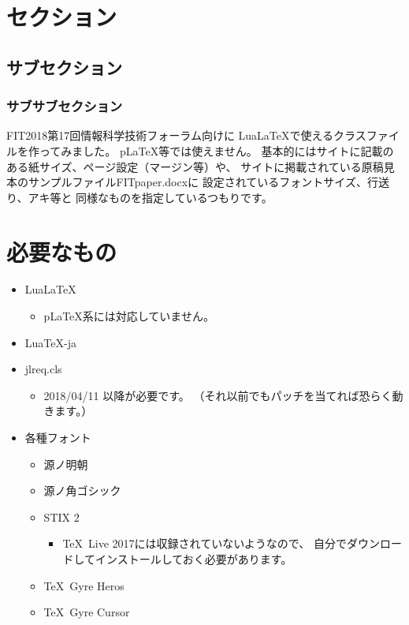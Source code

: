 \documentclass{FITpaper}
\begin{document}
\maketitle

\section{セクション}
\subsection{サブセクション}
\subsubsection{サブサブセクション}

FIT2018第17回情報科学技術フォーラム\cite{fit2018}向けに
Lua\LaTeX で使えるクラスファイル\cite{fitpaper-class}を作ってみました。
p\LaTeX 等では使えません。
基本的にはサイトに記載のある紙サイズ、ページ設定（マージン等）や、
サイトに掲載されている原稿見本のサンプルファイルFITpaper.docxに
設定されているフォントサイズ、行送り、アキ等と
同様なものを指定しているつもりです。

\section{必要なもの}

\begin{itemize}
\item Lua\LaTeX
  \begin{itemize}
  \item p\LaTeX 系には対応していません。
  \end{itemize}
\item Lua\TeX -ja
\item jlreq.cls
  \begin{itemize}
  \item 2018/04/11 以降が必要です。
    （それ以前でもパッチ\cite{column_gap}を当てれば恐らく動きます。）
  \end{itemize}
\item 各種フォント
  \begin{itemize}
  \item 源ノ明朝
  \item 源ノ角ゴシック
  \item STIX 2
    \begin{itemize}
    \item \TeX~Live 2017には収録されていないようなので、
      自分でダウンロードしてインストールしておく必要があります。
    \end{itemize}
  \item \TeX~Gyre Heros
  \item \TeX~Gyre Cursor
  \end{itemize}
\end{itemize}
\end{document}
